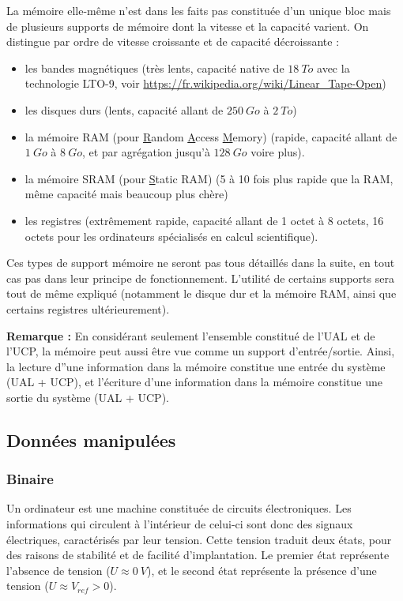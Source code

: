 \documentclass[../../main.tex]{subfiles}
\begin{document}
La mémoire elle-même n'est dans les faits pas constituée d'un unique bloc mais de plusieurs supports de mémoire dont la vitesse et la capacité varient. On distingue par ordre de vitesse croissante et de capacité décroissante :
\begin{itemize}
    \item les bandes magnétiques (très lents, capacité native de $18\ To$ avec la technologie LTO-9, voir \url{https://fr.wikipedia.org/wiki/Linear_Tape-Open})
    \item les disques durs (lents, capacité allant de $250\ Go$ à $2\ To$)
    \item la mémoire RAM (pour \underline{R}andom \underline{A}ccess \underline{M}emory) (rapide, capacité allant de $1\ Go$ à $8\ Go$, et par agrégation jusqu'à $128\ Go$ voire plus).
    \item la mémoire SRAM  (pour \underline{S}tatic RAM) (5 à 10 fois plus rapide que la RAM, même capacité mais beaucoup plus chère)
    \item les registres (extrêmement rapide, capacité allant de 1 octet à 8 octets, 16 octets pour les ordinateurs spécialisés en calcul scientifique).
\end{itemize}
Ces types de support mémoire ne seront pas tous détaillés dans la suite, en tout cas pas dans leur principe de fonctionnement. L'utilité de certains supports sera tout de même expliqué (notamment le disque dur et la mémoire RAM, ainsi que certains registres ultérieurement).

\textbf{Remarque :} En considérant seulement l'ensemble constitué de l'UAL et de l'UCP, la mémoire peut aussi être vue comme un support d'entrée/sortie. Ainsi, la lecture d''une information dans la mémoire constitue une entrée du système (UAL + UCP), et l'écriture d'une information dans la mémoire constitue une sortie du système (UAL + UCP).
\subsection{Données manipulées}
\label{sub:donn_es_manipul_es}
\subsubsection{Binaire}
\label{ssub:binaire}
Un ordinateur est une machine constituée de circuits électroniques. Les informations qui circulent à l'intérieur de celui-ci sont donc des signaux électriques, caractérisés par leur tension. Cette tension traduit deux états, pour des raisons de stabilité et de facilité d'implantation. Le premier état représente l'absence de tension ($U \approx 0\ V$), et le second état représente la présence d'une tension ($U \approx V_{ref} > 0$).
\end{document}
